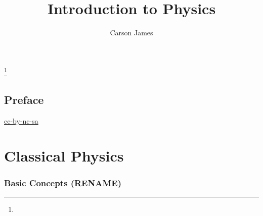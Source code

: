 \documentclass{book}
\begin{document}
	
	\frontmatter
	
	\title{Introduction to Physics}
	
	
	\author{Carson James}
	\thanks{}
	
	\date{}
	
	\maketitle
	
	
	\setcounter{page}{4}
	
	\tableofcontents
	\printunsrtglossary[type=symbols,style=long,title={Notation}]
	
	
	\mainmatter
	
	\chapter*{Preface}
	
	\begin{flushleft}
		\href{https://creativecommons.org/licenses/by-nc-sa/4.0/legalcode.txt}{cc-by-nc-sa}
	\end{flushleft}
	
	\newpage
	
	
	
	
	
	
	
	\newpage
	\part{Classical Physics}
	
	\section{Basic Concepts (RENAME)}
	
\end{document}
